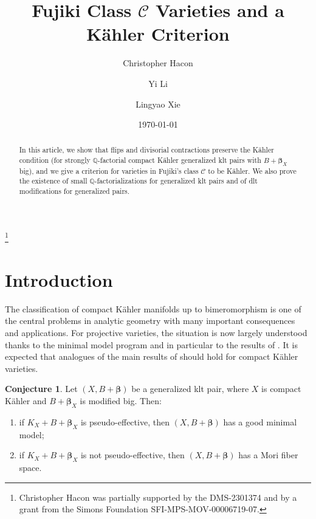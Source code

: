 \documentclass[11pt]{amsart}
\numberwithin{equation}{section}
\def\bbeta{\boldsymbol{\beta}}
\theoremstyle{definition}
\theoremstyle{definition}
\theoremstyle{definition}
\newtheorem{conjecture}[theorem]{Conjecture}
\begin{document}
 

\author{Christopher Hacon} \address{Department of Mathematics\\ University of Utah\\ 155 S 1400 E\\ Salt Lake City, Utah 84112} 
\thanks{Christopher Hacon was partially supported by the DMS-2301374 and
by a grant from the Simons Foundation SFI-MPS-MOV-00006719-07.}
\author{Yi Li}
  \address{Department of Mathematics, Wuhan University, Hubei, Wuhan 430074, China}
\author{Lingyao Xie} \address{Department of Mathematics\\ University of California, San Diego \\ 9500 Gilman Drive
 0112\\ La Jolla, CA 92093-0112, USA} 
\date{\today}
 


\title{Fujiki Class $\mathcal C$ Varieties and a K\"ahler Criterion}
\maketitle
\begin{abstract}
In this article, we show that flips and divisorial contractions preserve the
K\"ahler condition (for strongly $\mathbb{Q}$-factorial compact K\"ahler
generalized klt pairs with $B+\bbeta_X$ big), and we give a criterion for
varieties in Fujiki's class $\mathcal C$ to be K\"ahler. We also prove the
existence of small $\mathbb Q$-factorializations for generalized klt pairs
and of dlt modifications for generalized pairs.
\end{abstract}
\tableofcontents
\section{Introduction}
The  classification of compact K\"ahler manifolds up to bimeromorphism is one of the central problems in analytic geometry with many important consequences and applications. 
For projective varieties, the situation is now largely understood thanks to the minimal model program and in particular to the results of \cite{BCHM10}. It is expected that analogues of the main results of \cite{BCHM10} should hold for compact K\"ahler varieties.

\begin{conjecture}
Let $(X,B+\bbeta)$ be a  generalized klt pair, where $X$ is compact K\"ahler and $B+\bbeta_X$ is modified big. Then:
\begin{enumerate}
\item if $K_X+B+\bbeta_X$ is pseudo-effective, then $(X,B+\bbeta)$ has a good minimal model;
\item if $K_X+B+\bbeta_X$ is not pseudo-effective, then $(X,B+\bbeta)$ has a Mori fiber space.
\end{enumerate}
\end{conjecture}
\end{document}
